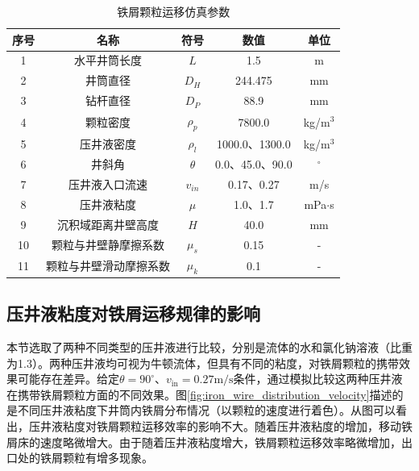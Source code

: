 \begin{table}[htbp]
    \centering
    \caption{铁屑颗粒运移仿真参数}
    \label{tab:simulation_params}
    \begin{tabular}{ccccc} 
        \toprule %
        序号 & 名称 & 符号 & 数值 & 单位 \\ 
        \midrule %
        
        1 & 水平井筒长度 & $L$ & 1.5 & m \\
        2 & 井筒直径 & $D_H$ & 244.475 & mm \\
        3 & 钻杆直径 & $D_P$ & 88.9 & mm \\
        4 & 颗粒密度 & $\rho_p$ & 7800.0 & kg/m$^3$ \\
        5 & 压井液密度 & $\rho_l$ & 1000.0、1300.0 & kg/m$^3$ \\
        6 & 井斜角 & $\theta$ & 0.0、45.0、90.0 & $^\circ$ \\
        7 & 压井液入口流速 & $v_{in}$ & 0.17、0.27 & m/s \\
        8 & 压井液粘度 & $\mu$ & 1.0、1.7 & mPa$\cdot$s \\
        9 & 沉积域距离井壁高度 & $H$ & 40.0 & mm \\
        10 & 颗粒与井壁静摩擦系数 & $\mu_s$ & 0.15 & - \\
        11 & 颗粒与井壁滑动摩擦系数 & $\mu_k$ & 0.1 & - \\
        
        \bottomrule %
    \end{tabular}
\end{table}

\subsection{压井液粘度对铁屑运移规律的影响}
本节选取了两种不同类型的压井液进行比较，分别是流体的水和氯化钠溶液（比重为1.3）。两种压井液均可视为牛顿流体，但具有不同的粘度，对铁屑颗粒的携带效果可能存在差异。给定$\theta=90^\circ$、$v_{\mathrm{in}}=0.27\mathrm{m/s}$条件，通过模拟比较这两种压井液在携带铁屑颗粒方面的不同效果。图\ref{fig:iron_wire_distribution_velocity}描述的是不同压井液粘度下井筒内铁屑分布情况（以颗粒的速度进行着色）。从图可以看出，压井液粘度对铁屑颗粒运移效率的影响不大。随着压井液粘度的增加，移动铁屑床的速度略微增大。由于随着压井液粘度增大，铁屑颗粒运移效率略微增加，出口处的铁屑颗粒有增多现象。

